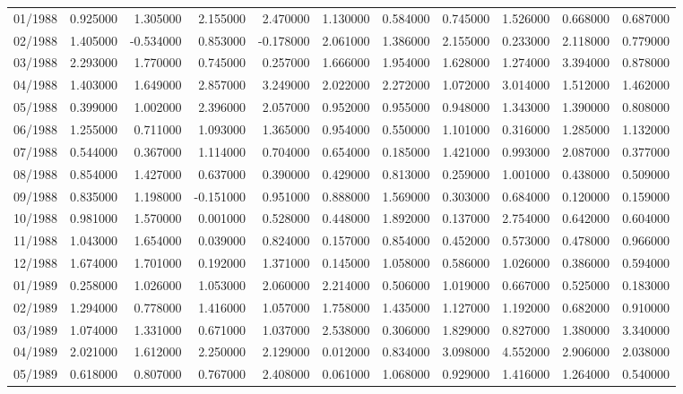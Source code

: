 \begin{tabular}{lrrrrrrrrrr}
01/1988 & 0.925000 & 1.305000 & 2.155000 & 2.470000 & 1.130000 & 0.584000 & 0.745000 & 1.526000 & 0.668000 & 0.687000 \\
02/1988 & 1.405000 & -0.534000 & 0.853000 & -0.178000 & 2.061000 & 1.386000 & 2.155000 & 0.233000 & 2.118000 & 0.779000 \\
03/1988 & 2.293000 & 1.770000 & 0.745000 & 0.257000 & 1.666000 & 1.954000 & 1.628000 & 1.274000 & 3.394000 & 0.878000 \\
04/1988 & 1.403000 & 1.649000 & 2.857000 & 3.249000 & 2.022000 & 2.272000 & 1.072000 & 3.014000 & 1.512000 & 1.462000 \\
05/1988 & 0.399000 & 1.002000 & 2.396000 & 2.057000 & 0.952000 & 0.955000 & 0.948000 & 1.343000 & 1.390000 & 0.808000 \\
06/1988 & 1.255000 & 0.711000 & 1.093000 & 1.365000 & 0.954000 & 0.550000 & 1.101000 & 0.316000 & 1.285000 & 1.132000 \\
07/1988 & 0.544000 & 0.367000 & 1.114000 & 0.704000 & 0.654000 & 0.185000 & 1.421000 & 0.993000 & 2.087000 & 0.377000 \\
08/1988 & 0.854000 & 1.427000 & 0.637000 & 0.390000 & 0.429000 & 0.813000 & 0.259000 & 1.001000 & 0.438000 & 0.509000 \\
09/1988 & 0.835000 & 1.198000 & -0.151000 & 0.951000 & 0.888000 & 1.569000 & 0.303000 & 0.684000 & 0.120000 & 0.159000 \\
10/1988 & 0.981000 & 1.570000 & 0.001000 & 0.528000 & 0.448000 & 1.892000 & 0.137000 & 2.754000 & 0.642000 & 0.604000 \\
11/1988 & 1.043000 & 1.654000 & 0.039000 & 0.824000 & 0.157000 & 0.854000 & 0.452000 & 0.573000 & 0.478000 & 0.966000 \\
12/1988 & 1.674000 & 1.701000 & 0.192000 & 1.371000 & 0.145000 & 1.058000 & 0.586000 & 1.026000 & 0.386000 & 0.594000 \\
01/1989 & 0.258000 & 1.026000 & 1.053000 & 2.060000 & 2.214000 & 0.506000 & 1.019000 & 0.667000 & 0.525000 & 0.183000 \\
02/1989 & 1.294000 & 0.778000 & 1.416000 & 1.057000 & 1.758000 & 1.435000 & 1.127000 & 1.192000 & 0.682000 & 0.910000 \\
03/1989 & 1.074000 & 1.331000 & 0.671000 & 1.037000 & 2.538000 & 0.306000 & 1.829000 & 0.827000 & 1.380000 & 3.340000 \\
04/1989 & 2.021000 & 1.612000 & 2.250000 & 2.129000 & 0.012000 & 0.834000 & 3.098000 & 4.552000 & 2.906000 & 2.038000 \\
05/1989 & 0.618000 & 0.807000 & 0.767000 & 2.408000 & 0.061000 & 1.068000 & 0.929000 & 1.416000 & 1.264000 & 0.540000 \\

\end{tabular}
